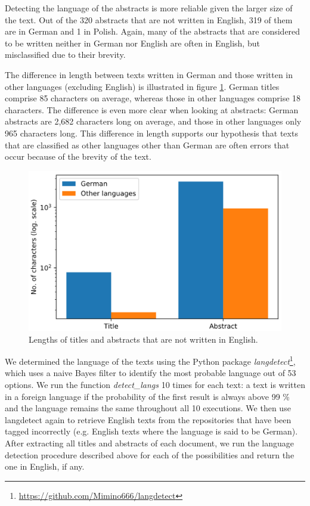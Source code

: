 Detecting the language of the abstracts is more reliable given the larger size of the text. Out of the 320 abstracts that are not written in English, 319 of them are in German and 1 in Polish. Again, many of the abstracts that are considered to be written neither in German nor English are often in English, but misclassified due to their brevity.

The difference in length between texts written in German and those written in other languages (excluding English) is illustrated in figure \ref{fig:foreign_languages}. German titles comprise 85 characters on average, whereas those in other languages comprise 18 characters. The difference is even more clear when looking at abstracts: German abstracts are 2,682 characters long on average, and those in other languages only 965 characters long. This difference in length supports our hypothesis that texts that are classified as other languages other than German are often errors that occur because of the brevity of the text.

\begin{figure}
    \centering
    \includegraphics[width=.7\textwidth]{figures/repository_analysis/foreign_languages.PNG}
    \caption{Lengths of titles and abstracts that are not written in English.}
    \label{fig:foreign_languages}
\end{figure}

We determined the language of the texts using the Python package \textit{langdetect}\footnote{\url{https://github.com/Mimino666/langdetect}}, which uses a naive Bayes filter to identify the most probable language out of 53 options. We run the function \textit{detect\_langs} 10 times for each text: a text is written in a foreign language if the probability of the first result is always above 99 \% and the language remains the same throughout all 10 executions. We then use langdetect again to retrieve English texts from the repositories that have been tagged incorrectly (e.g. English texts where the language is said to be German). After extracting all titles and abstracts of each document, we run the language detection procedure described above for each of the possibilities and return the one in English, if any.

